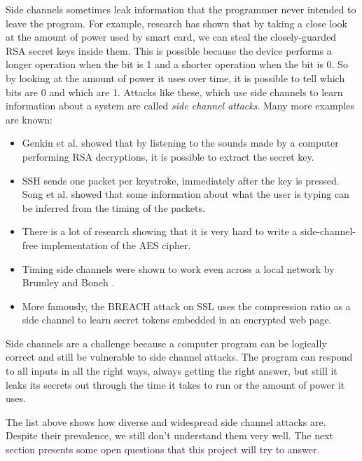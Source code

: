 \documentclass{acm_proc_article-sp}
\begin{document}
Side channels sometimes leak information that the programmer never intended to
leave the program. For example, research \cite{messerges1999power} has shown
that by taking a close look at the amount of power used by smart card, we can
steal the closely-guarded RSA secret keys inside them. This is possible because the
device performs a longer operation when the bit is 1 and a shorter operation
when the bit is 0. So by looking at the amount of power it uses over time, it is
possible to tell which bits are 0 and which are 1. Attacks like these, which use
side channels to learn information about a system are called \emph{side channel
attacks}. Many more examples are known:

\begin{itemize}
\item Genkin et al. \cite{genkin2013rsa} showed that by listening to the sounds
made by a computer performing RSA decryptions, it is possible to extract the
secret key.

\item SSH sends one packet per keystroke, immediately after the key is pressed.
Song et al. \cite{song2001timing} showed that some information about what the
user is typing can be inferred from the timing of the packets.

\item There is a lot of research \cite{bernstein2005cache, osvik2006cache,
weiss2012cache, aciiccmez2006cache} showing that it is very hard to write
a side-channel-free implementation of the AES cipher.

\item Timing side channels were shown to work even across a local network by
Brumley and Boneh \cite{brumley2005remote}.

\item More famously, the BREACH attack on SSL \cite{gluck2013breach} uses the
compression ratio as a side channel to learn secret tokens embedded in an
encrypted web page.
\end{itemize}

Side channels are a challenge because a computer program can be logically
correct and still be vulnerable to side channel attacks. The program can respond
to all inputs in all the right ways, always getting the right answer, but still
it leaks its secrets out through the time it takes to run or the amount of power
it uses.

The list above shows how diverse and widespread side channel attacks are.
Despite their prevalence, we still don't understand them very well. The next
section presents some open questions that this project will try to answer.
\end{document}
